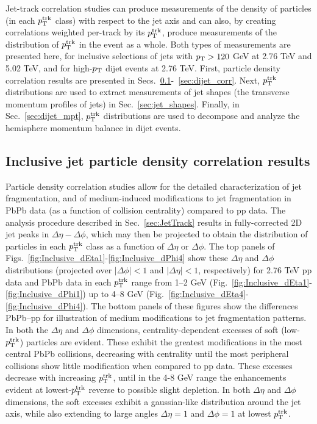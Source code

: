 

Jet-track correlation studies can produce measurements of the density of particles (in each $p_{\rm T}^{\rm trk}$ class) with respect to the jet axis and can also, by creating correlations weighted per-track by its $p_{\rm T}^{\rm trk}$, produce measurements of the distribution of $p_{\rm T}^{\rm trk}$ in the event as a whole.  Both types of measurements are presented here, for inclusive selections of jets with $p_{\rm T} > 120$ GeV at 2.76 TeV and 5.02 TeV, and for high-$p_{\rm T}$ dijet events at 2.76 TeV.  First, particle density correlation results are presented in Secs.~\ref{sec:inc_corr}-~\ref{sec:dijet_corr}.  Next, $p_{\rm T}^{\rm trk}$ distributions are used to extract measurements of jet shapes (the transverse momentum profiles of jets) in Sec.~\ref{sec:jet_shapes}.  Finally, in Sec.~\ref{sec:dijet_mpt}, $p_{\rm T}^{\rm trk}$ distributions are used to decompose and analyze the hemisphere momentum balance in dijet events.

\subsection{Inclusive jet particle density correlation results}
\label{sec:inc_corr}


Particle density correlation studies allow for the detailed characterization of jet fragmentation, and of medium-induced modifications to jet fragmentation in PbPb data (as a function of collision centrality) compared to pp data.  The analysis procedure described in Sec.~\ref{sec:JetTrack} results in fully-corrected 2D jet peaks in $\Delta\eta-\Delta\phi$, which may then be projected to obtain the distribution of particles in each $p_{\rm T}^{\rm trk}$ class as a function of $\Delta\eta$ or $\Delta\phi$.  The top panels of Figs.~\ref{fig:Inclusive_dEta1}-\ref{fig:Inclusive_dPhi4} show these $\Delta\eta$ and $\Delta\phi$ distributions (projected over $|\Delta\phi| < 1$ and $|\Delta\eta| < 1$, respectively) for 2.76 TeV pp data and PbPb data in each $p_{\rm T}^{\rm trk}$ range from 1--2 GeV (Fig.~\ref{fig:Inclusive_dEta1}-\ref{fig:Inclusive_dPhi1}) up to 4--8 GeV (Fig.~\ref{fig:Inclusive_dEta4}-\ref{fig:Inclusive_dPhi4}).  The bottom panels of these figures show the differences PbPb--pp for illustration of medium modifications to jet fragmentation patterns.  In both the $\Delta\eta$ and $\Delta\phi$ dimensions, centrality-dependent excesses of soft (low-$p_{\rm T}^{\rm trk}$) particles are evident.  These exhibit the greatest modifications in the most central PbPb collisions, decreasing with centrality until the most peripheral collisions show little modification when compared to pp data.  These excesses decrease with increasing $p_{\rm T}^{\rm trk}$, until in the 4-8 GeV range the enhancements evident at lowest-$p_{\rm T}^{\rm trk}$ reverse to possible slight depletion.  In both $\Delta\eta$ and $\Delta\phi$ dimensions, the soft excesses exhibit a gaussian-like distribution around the jet axis, while also extending to large angles $\Delta\eta = 1$ and $\Delta\phi = 1$ at lowest $p_{\rm T}^{\rm trk}$.  

